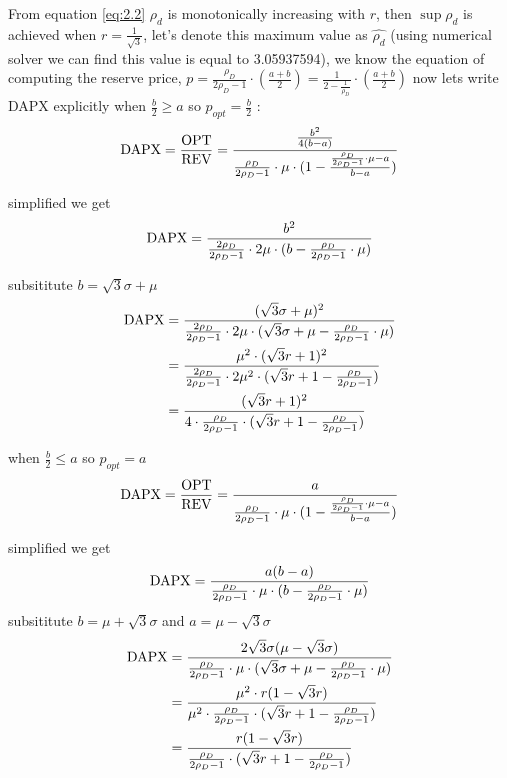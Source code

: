 From  equation \ref{eq:2.2} $\rho_d$ is monotonically increasing with $r$, then $\sup \rho_d$ is achieved when $r = \frac{1}{\sqrt{3}}$, let's denote this maximum value as $\hat{\rho_d}$ (using numerical solver we can find this value is equal to 3.05937594), we know the equation of computing the reserve price, $p = \frac{\rho_{D}}{2\rho_{D}-1}\cdot (\frac{a+b}{2}) =\frac{1}{2-\frac{1}{\rho_D}}\cdot (\frac{a+b}{2})$ 
now lets write DAPX explicitly when  $\frac{b}{2} \geqslant a$ so $p_{opt} = \frac{b}{2}$ : 
\begin{equation}\notag
\text{DAPX} = \frac{\text{OPT}}{\text{REV}} =  \frac{\frac{b^{2}}{4(b-a)}}{\frac{\rho_{D}}{2\rho_{D}-1}\cdot \mu \cdot (1-\frac{\frac{\rho_{D}}{2\rho_{D}-1}\cdot \mu -a}{b-a})}
\end{equation} 

simplified we get 
\begin{equation}\notag
\text{DAPX}=\frac{b^{2}}{\frac{2\rho_{D}}{2\rho_{D}-1}\cdot 2\mu \cdot(b-\frac{\rho_{D}}{2\rho_{D}-1}\cdot \mu)}
\end{equation} 

subsititute $b = \sqrt{3}\sigma + \mu $
\begin{equation}\notag
	\begin{split}	
		\text{DAPX} &=\frac{( \sqrt{3}\sigma + \mu)^{2}}{\frac{2\rho_{D}}{2\rho_{D}-1}\cdot 2\mu \cdot( \sqrt{3}\sigma + \mu-\frac{\rho_{D}}{2\rho_{D}-1}\cdot \mu)} \\&= \frac{\mu^2 \cdot( \sqrt{3}r +1)^{2}}{\frac{2\rho_{D}}{2\rho_{D}-1}\cdot 2\mu^2 \cdot( \sqrt{3}r+ 1-\frac{\rho_{D}}{2\rho_{D}-1})}\\ 
		&= \frac{ ( \sqrt{3}r +1)^{2}}{4 \cdot \frac{ \rho_{D}}{2\rho_{D}-1}\cdot( \sqrt{3}r+ 1-\frac{\rho_{D}}{2\rho_{D}-1})}	
	\end{split}
\end{equation} 

when  $\frac{b}{2} \leqslant a$ so $p_{opt} = a$ 
\begin{equation}\notag
\text{DAPX} = \frac{\text{OPT}}{\text{REV}} =  \frac{a}{\frac{\rho_{D}}{2\rho_{D}-1}\cdot \mu \cdot (1-\frac{\frac{\rho_{D}}{2\rho_{D}-1}\cdot \mu -a}{b-a})}
\end{equation} 

simplified we get 
\begin{equation}\notag
\text{DAPX}=\frac{a(b-a)}{\frac{\rho_{D}}{2\rho_{D}-1}\cdot \mu \cdot(b-\frac{\rho_{D}}{2\rho_{D}-1}\cdot \mu)}
\end{equation} 
subsititute $b =  \mu +\sqrt{3}\sigma $ and $a  = \mu - \sqrt{3}\sigma$
\begin{equation}\notag
\begin{split}	
	\text{DAPX} &=\frac{2\sqrt{3}\sigma (\mu - \sqrt{3}\sigma)}{\frac{\rho_{D}}{2\rho_{D}-1}\cdot \mu \cdot( \sqrt{3}\sigma + \mu-\frac{\rho_{D}}{2\rho_{D}-1}\cdot \mu)} \\&= \frac{\mu^2 \cdot r( 1-\sqrt{3}r )}{\mu^2 \cdot \frac{\rho_{D}}{2\rho_{D}-1}\cdot( \sqrt{3}r+ 1-\frac{\rho_{D}}{2\rho_{D}-1})}\\ &= \frac{r( 1-\sqrt{3}r )}{\frac{\rho_{D}}{2\rho_{D}-1}\cdot( \sqrt{3}r+ 1-\frac{\rho_{D}}{2\rho_{D}-1})}
\end{split}
\end{equation} 

